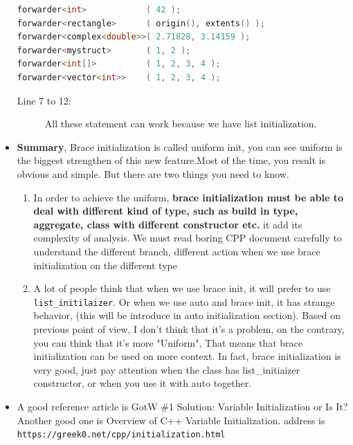 \documentclass[a4paper,11pt,twoside]{book}
\begin{document}
\begin{itemize}
\begin{lstlisting}[frame=single, language=c++,mathescape=true]
forwarder<int>            ( 42 );                  
forwarder<rectangle>      ( origin(), extents() ); 
forwarder<complex<double>>( 2.71828, 3.14159 );    
forwarder<mystruct>       ( 1, 2 );                
forwarder<int[]>          ( 1, 2, 3, 4 );          
forwarder<vector<int>>    ( 1, 2, 3, 4 );          
\end{lstlisting}
\begin{description}
	\item[Line 7 to 12:] All these statement can work because we have list initialization.
\end{description}

	
	\item \textbf{Summary}, Brace initialization is called uniform init, you can see uniform is the biggest strengthen of this new feature.Most of the time, you result is obvious and simple. But there are two things you need to know.

	\begin{enumerate}
		\item In order to achieve the uniform, \textbf{brace initialization must be able to deal with different kind of type, such as build in type, aggregate, class with different constructor etc.} it add its complexity of analysis. We must read boring CPP document carefully to understand the different branch, different action when we use brace initialization on the different type 
		
		\item A lot of people think that when we use brace init, it will prefer to use \texttt{list\_initilaizer}. Or when we use auto and brace init, it has strange behavior, (this will be introduce in auto initialization section). Based on previous point of view, I don't think that it's a problem, on the contrary, you can think that it's more "Uniform", That means that brace initialization can be used on more context. In fact, brace initialization is very good, just pay attention when the class has list\_initiaizer constructor, or when you use it with auto together.
	\end{enumerate}

	\item A good reference article is GotW \#1 Solution: Variable Initialization or Is It? Another good one is Overview of C++ Variable Initialization. address is \\ \verb=https://greek0.net/cpp/initialization.html=
	

\end{itemize}
\end{document}
